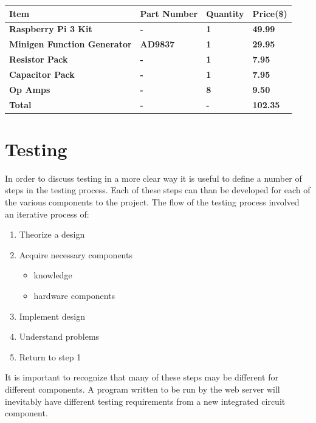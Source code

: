 \documentclass{article}	%
\begin{document}
\begin{multicols}{2}
\begin{center}
\begin{tabularx}{0.4\textwidth}{|X|X|X|X|}
        \textbf{Item} &
        \textbf{Part Number} &
        \textbf{Quantity} &
        \textbf{Price(\$)} \\
        \hline

        \textbf{Raspberry Pi 3 Kit} &
        \textbf{-} &
        \textbf{1} &
        \textbf{49.99} \\
        \hline

        \textbf{Minigen Function Generator} &
        \textbf{AD9837} &
        \textbf{1} &
        \textbf{29.95} \\
        \hline

        \textbf{Resistor Pack} &
        \textbf{-} &
        \textbf{1} &
        \textbf{7.95} \\
        \hline

        \textbf{Capacitor Pack} &
        \textbf{-} &
        \textbf{1} &
        \textbf{7.95} \\
        \hline

        \textbf{Op Amps} &
        \textbf{-} &
        \textbf{8} &
        \textbf{9.50} \\
        \hline

        \textbf{Total} &
        \textbf{-} &
        \textbf{-} &
        \textbf{102.35} \\

        \hline
    \end{tabularx}
\end{center}

\section{Testing}
In order to discuss testing in a more clear way
it is useful to define a number of steps
in the testing process.
Each of these steps can than be developed for
each of the various components to the project.
%
The flow of the testing process
involved an iterative process of:
\begin{enumerate}
\item Theorize a design
\item Acquire necessary components
    \begin{itemize}
    \item knowledge
    \item hardware components
    \end{itemize}
\item Implement design
\item Understand problems
\item Return to step 1
\end{enumerate}
%
It is important to recognize that many
of these steps may be different for different components.
A program written to be run by the web server
will inevitably have different testing requirements from
a new integrated circuit component.


\end{multicols}
\end{document}
